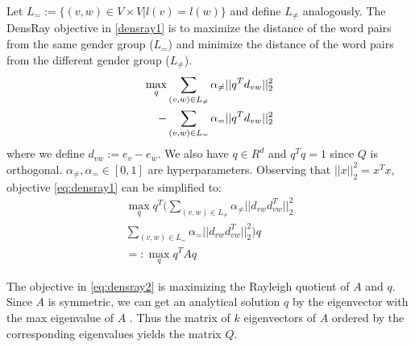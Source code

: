 Let $L_{=}:=\{(v,w)\in V\times V|l(v)=l(w)\}$ and define
$L_{\neq}$ analogously.  The DensRay objective
in \eqref{densray1} is to maximize the distance of the word
pairs from the same gender group ($L_{=}$) and minimize the
distance of the word pairs from the different gender group
($L_{\neq}$).
\begin{eqnarray}
    \max\limits_{q} 
    \sum_{(v,w)\in L_{\neq}}\alpha_{\neq}||q^Td_{vw}||^2_2\nonumber\\
    -\sum_{(v,w)\in L_{=}}\alpha_{=}||q^Td_{vw}||^2_2
\eqlabel{densray1}
\end{eqnarray}
where we define $d_{vw}:=e_v-e_w$. We also have $q\in R^d$
and $q^Tq=1$ since $Q$ is  orthogonal. $\alpha_{\neq},\alpha_{=}\in [0,1]$ are hyperparameters. Observing that $||x||^2_2=x^Tx$, objective \eqref{eq:densray1} can be simplified to:
\begin{eqnarray}
    \max \limits_{q} q^T(
    \sum_{(v,w)\in L_{\neq}}\alpha_{\neq}||d_{vw}d_{vw}^T||^2_2\nonumber\\
    \sum_{(v,w)\in L_{=}}\alpha_{=}||d_{vw}d_{vw}^T||^2_2)q\nonumber\\
    =:\max\limits_{q} q^TAq
\label{eq:densray2}
\end{eqnarray}

The objective in \eqref{eq:densray2} is maximizing the Rayleigh quotient of $A$ and $q$. Since $A$ is symmetric, we can get an analytical solution $q$ by the eigenvector with the max eigenvalue of $A$ \citep{horn1990matrix}. Thus the matrix of $k$ eigenvectors of $A$ ordered by the corresponding eigenvalues yields the matrix $Q$.



